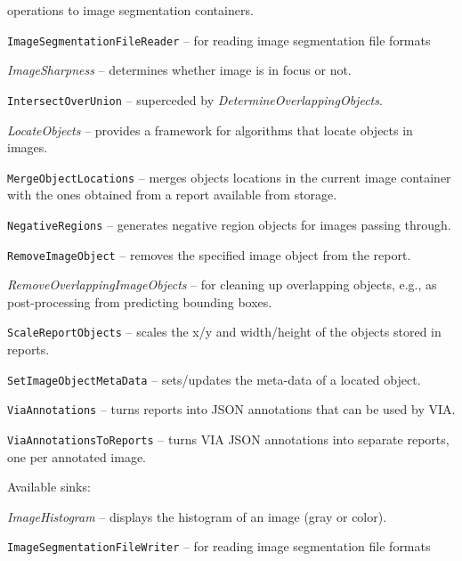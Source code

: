 \documentclass[a4paper]{book}
\begin{document}
\begin{tight_itemize}
  operations to image segmentation containers.
  \item \texttt{ImageSegmentationFileReader} -- for reading image segmentation file formats
  \item \textit{ImageSharpness} -- determines whether image is in focus or not.
  \item \texttt{IntersectOverUnion} -- superceded by \textit{DetermineOverlappingObjects}.
  \item \textit{LocateObjects} -- provides a framework for algorithms that
  locate objects in images.
  \item \texttt{MergeObjectLocations} -- merges objects locations
  in the current image container with the ones obtained from a report
  available from storage.
  \item \texttt{NegativeRegions} -- generates negative region objects
  for images passing through.
  \item \texttt{RemoveImageObject} -- removes the specified image object
  from the report.
  \item \textit{RemoveOverlappingImageObjects} -- for cleaning up
  overlapping objects, e.g., as post-processing from predicting bounding
  boxes.
  \item \texttt{ScaleReportObjects} -- scales the x/y and width/height
  of the objects stored in reports.
  \item \texttt{SetImageObjectMetaData} -- sets/updates the meta-data of
  a located object.
  \item \texttt{ViaAnnotations} -- turns reports into JSON annotations that
  can be used by VIA\cite{via}.
  \item \texttt{ViaAnnotationsToReports} -- turns VIA JSON annotations into
  separate reports, one per annotated image.
\end{tight_itemize}

\noindent Available sinks:
\begin{tight_itemize}
  \item \textit{ImageHistogram} -- displays the histogram of an image (gray or color).
  \item \texttt{ImageSegmentationFileWriter} -- for reading image segmentation file formats
\end{tight_itemize}


\end{document}
